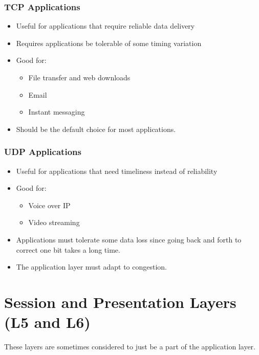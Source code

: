 \subsubsection{TCP Applications}\label{ssub:tcp_applications}

\begin{itemize}
	\item Useful for applications that require reliable data delivery
	\item Requires applications be tolerable of some timing variation
	\item Good for:
	      \begin{itemize}
		      \item File transfer and web downloads
		      \item Email
		      \item Instant messaging
	      \end{itemize}
	\item Should be the default choice for most applications.
\end{itemize}

\subsubsection{UDP Applications}\label{ssub:udp_applications}

\begin{itemize}
	\item Useful for applications that need timeliness instead of reliability
	\item Good for:
	      \begin{itemize}
		      \item Voice over IP
		      \item Video streaming
	      \end{itemize}
	\item Applications must tolerate some data loss since going back and forth to correct one bit takes a long time.
	\item The application layer must adapt to congestion.
\end{itemize}

\section{Session and Presentation Layers (L5 and L6)}\label{sec:session_and_presentation_layers_l5_and_l6_}

\begin{note}
	These layers are sometimes considered to just be a part of the application layer.
\end{note}


